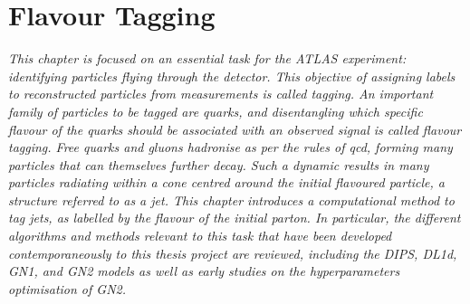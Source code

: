 \chapter{\color{oxfordblue} Flavour Tagging}\label{chap-ftag}
\ChapFrame

\textit{
This chapter is focused on an essential task for the ATLAS experiment: identifying particles flying through the detector. This objective of assigning labels to reconstructed particles from measurements is called tagging. An important family of particles to be tagged are quarks, and disentangling which specific flavour of the quarks should be associated with an observed signal is called flavour tagging. Free quarks and gluons hadronise as per the rules of \gls{qcd}, forming many particles that can themselves further decay. Such a dynamic results in many particles radiating within a cone centred around the initial flavoured particle, a structure referred to as a jet. This chapter introduces a computational method to tag jets, as labelled by the flavour of the initial parton. In particular, the different algorithms and methods relevant to this task that have been developed contemporaneously to this thesis project are reviewed, including the DIPS, DL1d, GN1, and GN2 models as well as early studies on the hyperparameters optimisation of GN2.
}

